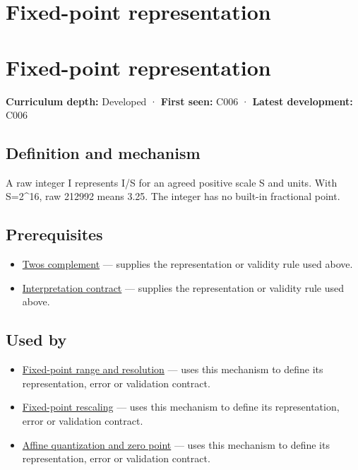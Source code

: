 \hypertarget{appendix-1d0dbe8924cc}{}
\section*{Fixed-point representation}
\section{Fixed-point representation}\label{appendix-1d0dbe8924cc-fixed-point-representation}

\textbf{Curriculum depth:} Developed · \textbf{First seen:} C006 · \textbf{Latest development:} C006

\subsection{Definition and mechanism}\label{appendix-1d0dbe8924cc-definition-and-mechanism}

A raw integer I represents I/S for an agreed positive scale S and units. With S=2\^{}16, raw 212992 means 3.25. The integer has no built-in fractional point.

\subsection{Prerequisites}\label{appendix-1d0dbe8924cc-prerequisites}

\begin{itemize}
\tightlist
\item
  \hyperref[appendix-4fbc03d20829]{Two\textquotesingle s complement} --- supplies the representation or validity rule used above.
\item
  \hyperref[appendix-f414bd4ed05c]{Interpretation contract} --- supplies the representation or validity rule used above.
\end{itemize}

\subsection{Used by}\label{appendix-1d0dbe8924cc-used-by}

\begin{itemize}
\tightlist
\item
  \hyperref[appendix-ceb4c4a9b5a1]{Fixed-point range and resolution} --- uses this mechanism to define its representation, error or validation contract.
\item
  \hyperref[appendix-3333db47830f]{Fixed-point rescaling} --- uses this mechanism to define its representation, error or validation contract.
\item
  \hyperref[appendix-d5da3eaabaef]{Affine quantization and zero point} --- uses this mechanism to define its representation, error or validation contract.
\end{itemize}

